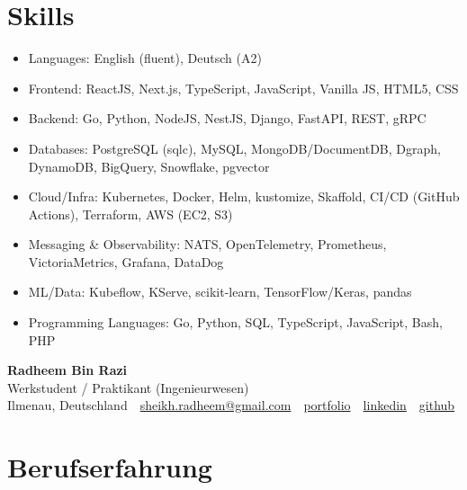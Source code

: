 \documentclass[10pt,a4paper]{resume}
\makeatletter
\newcommand{\Portfolio}{https://radheem.github.io/my-cv}
\newcommand{\PortfolioText}{portfolio}
\newcommand{\GitHub}{https://github.com/radheem}
\newcommand{\LinkedIn}{https://www.linkedin.com/in/radheem-razi}
\newcommand{\Email}{sheikh.radheem@gmail.com}
\makeatother
\begin{document}
\section{Skills}

\begin{itemize}[leftmargin=1.4em,nosep,topsep=2pt]
  \item Languages: English (fluent), Deutsch (A2)
  \item Frontend: ReactJS, Next.js, TypeScript, JavaScript, Vanilla JS, HTML5, CSS
  \item Backend: Go, Python, NodeJS, NestJS, Django, FastAPI, REST, gRPC
  \item Databases: PostgreSQL (sqlc), MySQL, MongoDB/DocumentDB, Dgraph, DynamoDB, BigQuery, Snowflake, pgvector
  \item Cloud/Infra: Kubernetes, Docker, Helm, kustomize, Skaffold, CI/CD (GitHub Actions), Terraform, AWS (EC2, S3)
  \item Messaging \& Observability: NATS, OpenTelemetry, Prometheus, VictoriaMetrics, Grafana, DataDog
  \item ML/Data: Kubeflow, KServe, scikit-learn, TensorFlow/Keras, pandas
  \item Programming Languages: Go, Python, SQL, TypeScript, JavaScript, Bash, PHP
\end{itemize}

\clearpage
{}

\begin{center}
  {\huge\bfseries Radheem Bin Razi}\\[3pt]
  {\large Werkstudent / Praktikant (Ingenieurwesen)}\\[6pt]
  \small
  Ilmenau, Deutschland \,\textbar\,
  \href{mailto:\Email}{\Email} \,\textbar\,
  \href{\Portfolio}{\PortfolioText} \,\textbar\,
  \href{\LinkedIn}{linkedin} \,\textbar\,
  \href{\GitHub}{github}
\end{center}
\vspace{2pt}

\section{Berufserfahrung}
\end{document}
